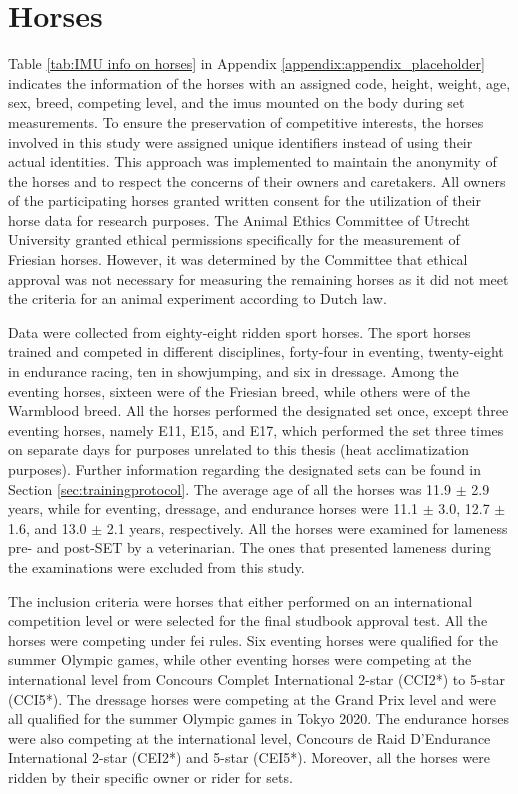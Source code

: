 \section{Horses}
\label{sec:Horses}

Table \ref{tab:IMU info on horses} in Appendix \ref{appendix:appendix_placeholder} indicates the information of the horses with an assigned code, height, weight, age, sex, breed, competing level, and the \gls{imu}s mounted on the body during \gls{set} measurements. To ensure the preservation of competitive interests, the horses involved in this study were assigned unique identifiers instead of using their actual identities. This approach was implemented to maintain the anonymity of the horses and to respect the concerns of their owners and caretakers. All owners of the participating horses granted written consent for the utilization of their horse data for research purposes. The Animal Ethics Committee of Utrecht University granted ethical permissions specifically for the measurement of Friesian horses. However, it was determined by the Committee that ethical approval was not necessary for measuring the remaining horses as it did not meet the criteria for an animal experiment according to Dutch law.

Data were collected from eighty-eight ridden sport horses. The sport horses trained and competed in different disciplines, forty-four in eventing, twenty-eight in endurance racing, ten in showjumping, and six in dressage. Among the eventing horses, sixteen were of the Friesian breed, while others were of the Warmblood breed. All the horses performed the designated \gls{set} once, except three eventing horses, namely E11, E15, and E17, which performed the \gls{set} three times on separate days for purposes unrelated to this thesis (heat acclimatization purposes). Further information regarding the designated \gls{set}s can be found in Section \ref{sec:trainingprotocol}. The average age of all the horses was 11.9 $\pm$ 2.9 years, while for eventing, dressage, and endurance horses were 11.1 $\pm$ 3.0, 12.7 $\pm$ 1.6, and 13.0 $\pm$ 2.1 years, respectively. All the horses were examined for lameness pre- and post-SET by a veterinarian. The ones that presented lameness during the examinations were excluded from this study.


The inclusion criteria were horses that either performed on an international competition level or were selected for the final studbook approval test. All the horses were competing under \gls{fei} rules. Six eventing horses were qualified for the summer Olympic games, while other eventing horses were competing at the international level from Concours Complet International 2-star (CCI2*) to 5-star (CCI5*). The dressage horses were competing at the Grand Prix level and were all qualified for the summer Olympic games in Tokyo 2020. The endurance horses were also competing at the international level, Concours de Raid D'Endurance International 2-star (CEI2*) and 5-star (CEI5*). Moreover, all the horses were ridden by their specific owner or rider for \gls{set}s.